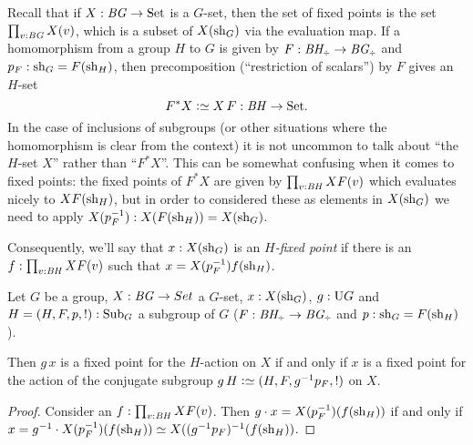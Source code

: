 Recall that if $X:\mathit{B}\mathit{G}\to\mathrm{Set}$ is a $G$-set, then the set of fixed points is the set $\prod_{v:\mathit{B}\mathit{G}}X(v)$, which is a subset of $X(\mathrm{sh}_G)$ via the evaluation map.  If a homomorphism from a group $H$ to $G$ is given by $F:\BH_\div\to \BG_\div$ and $p_F:\mathrm{sh}_G=F(\mathrm{sh}_H)$, then precomposition (``restriction of scalars'') by $F$ gives an $H$-set
$$F^*X\defequi X\,F:\BH\to\Set.$$
In the case of inclusions of subgroups (or other situations where the homomorphism is clear from the context) it is not uncommon to talk about ``the $H$-set $X$'' rather than ``$F^*X$''.
This can be somewhat confusing when it comes to fixed points: the fixed points of $F^*X$ are given by $\prod_{v:\mathit{B}\mathit{H}}XF(v)$ which evaluates nicely to $XF(\mathrm{sh}_H)$, but in order to considered  these as elements in $X(\mathrm{sh}_G)$ we need to apply $X(p_F^{-1}):X(F(\mathrm{sh}_H))=X(\mathrm{sh}_G)$.

Consequently, we'll say that $x:X(\mathrm{sh}_G)$ is an \emph{$H$-fixed point} if there is an $f:\prod_{v:\mathit{B}\mathit{H}}XF(v)$ such that $x=X(p_F^{-1})f(\mathrm{sh}_H)$.



\begin{lemma}
  \label{lem:thereisaconjugate}
  Let $G$ be a group, $X:\mathit{B}\mathit{G}\to Set$ a $G$-set, $x:X(\mathrm{sh}_G)$, $g:\mathrm{U} G$ and $H=(H,F,p,!):\mathrm{Sub}_G$ a subgroup of $G$ ($F:\BH_\div\to \BG_\div$ and $p:\mathrm{sh}_G=F(\mathrm{sh}_H)$).

Then $g\,x$ is a fixed point for the $H$-action on $X$ if and only if $x$ is a fixed point for the action  of the conjugate subgroup $g\,H\defequi(H,F,g^{-1}p_F,!)$ on $X$.
\end{lemma}
\begin{proof}
  Consider an $f:\prod_{v:\mathit{B}\mathit{H}}XF(v)$.  Then $g\cdot x=X(p_F^{-1})(f(\mathrm{sh}_H))$ if and only if $x=g^{-1}\cdot X(p_F^{-1})(f(\shape_H))\oldequiv X((g^{-1}p_F)^{-1}(f(\shape_H))$.
\end{proof}




